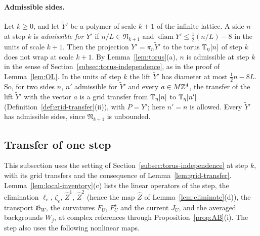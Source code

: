 \paragraph{Admissible sides.} Let $k\ge0$, and let $\tilde Y'$ be a polymer of scale $k+1$ of the infinite lattice. A side $n$ at step $k$ is \emph{admissible for $\tilde Y'$} if $n/L\in\mathfrak N_{k+1}$ and $\operatorname{diam}\tilde Y'\le\frac12(n/L)-8$ in the units of scale $k+1$. Then the projection $Y'=\pi_n\tilde Y'$ to the torus $\mathbb T_\eta[n]$ of step $k$ does not wrap at scale $k+1$. By Lemma~\ref{lem:torus}(a), $n$ is admissible at step $k$ in the sense of Section~\ref{subsec:torus-independence}, as in the proof of Lemma~\ref{lem:OL}. In the units of step $k$ the lift $\tilde Y'$ has diameter at most $\frac12n-8L$. So, for two sides $n$, $n'$ admissible for $\tilde Y'$ and every $a\in M\mathbb Z^4$, the transfer of the lift $\tilde Y'$ with the vector $a$ is a grid transfer from $\mathbb T_\eta[n]$ to $\mathbb T_\eta[n']$ (Definition~\ref{def:grid-transfer}(ii)), with $P=Y'$; here $n'=n$ is allowed. Every $\tilde Y'$ has admissible sides, since $\mathfrak N_{k+1}$ is unbounded.

\subsection{Transfer of one step}\label{subsec:gl-transfer}

This subsection uses the setting of Section~\ref{subsec:torus-independence} at step $k$, with its grid transfers and the consequence of Lemma~\ref{lem:grid-transfer}. Lemma~\ref{lem:local-inventory}(c) lists the linear operators of the step, the elimination $\ell_c$, $\zeta_c$, $\hat Z^1$, $\hat Z^2$ (hence the map $\hat Z$ of Lemma~\ref{lem:eliminate}(d)), the transport $\mathfrak G_W$, the curvatures $F_U$, $F^s_U$ and the current $J_U$, and the averaged backgrounds $W_j$, at complex references through Proposition~\ref{prop:AB}(i). The step also uses the following nonlinear maps.

